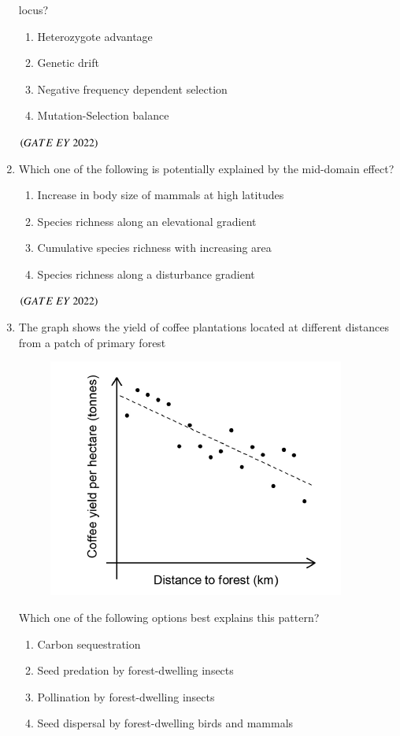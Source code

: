 \documentclass[journal]{IEEEtran}
\numberwithin{equation}{enumi}
\numberwithin{figure}{enumi}
\begin{document}
\begin{enumerate}
locus?
    \begin{enumerate}
        \item  Heterozygote advantage
        \item  Genetic drift
        \item  Negative frequency dependent selection
        \item  Mutation-Selection balance
    \end{enumerate}
    \hfill{$\brak{ GATE\ EY\ 2022}$}
    \bigskip
 \item Which one of the following is potentially explained by the mid-domain effect?
    \begin{enumerate}
        \item  Increase in body size of mammals at high latitudes
        \item  Species richness along an elevational gradient
        \item  Cumulative species richness with increasing area
        \item  Species richness along a disturbance gradient
    \end{enumerate}
    \hfill{$\brak{ GATE\ EY\ 2022}$}
    \bigskip
 \item The graph shows the yield of coffee plantations located at different distances from
a patch of primary forest
\begin{figure}[H]
    \centering
\includegraphics[width=0.5\columnwidth]{figs/6.png}
    \caption{}
    \label{fig:6}
   \end{figure}
Which one of the following options best explains this pattern?
    \begin{enumerate}
        \item  Carbon sequestration
        \item  Seed predation by forest-dwelling insects
        \item  Pollination by forest-dwelling insects
        \item  Seed dispersal by forest-dwelling birds and mammals

\end{enumerate}
\end{enumerate}
\end{document}
